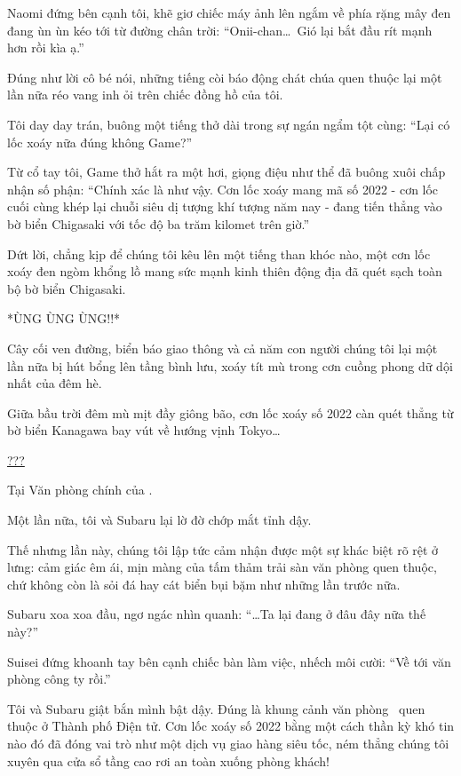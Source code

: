 \documentclass[../main.tex]{subfiles}
\begin{document}
Naomi đứng bên cạnh tôi, khẽ giơ chiếc máy ảnh lên ngắm về phía rặng mây đen đang ùn ùn kéo tới từ đường chân trời: ``Onii-chan\dots\ Gió lại bắt đầu rít mạnh hơn rồi kìa ạ.''

Đúng như lời cô bé nói, những tiếng còi báo động chát chúa quen thuộc lại một lần nữa réo vang inh ỏi trên chiếc đồng hồ của tôi.

Tôi day day trán, buông một tiếng thở dài trong sự ngán ngẩm tột cùng: ``Lại có lốc xoáy nữa đúng không Game?''

Từ cổ tay tôi, Game thở hắt ra một hơi, giọng điệu như thể đã buông xuôi chấp nhận số phận: ``Chính xác là như vậy. Cơn lốc xoáy mang mã số 2022 - cơn lốc cuối cùng khép lại chuỗi siêu dị tượng khí tượng năm nay - đang tiến thẳng vào bờ biển Chigasaki với tốc độ ba trăm kilomet trên giờ.''

Dứt lời, chẳng kịp để chúng tôi kêu lên một tiếng than khóc nào, một cơn lốc xoáy đen ngòm khổng lồ mang sức mạnh kinh thiên động địa đã quét sạch toàn bộ bờ biển Chigasaki.

*ÙNG ÙNG ÙNG!!*

Cây cối ven đường, biển báo giao thông và cả năm con người chúng tôi lại một lần nữa bị hút bổng lên tầng bình lưu, xoáy tít mù trong cơn cuồng phong dữ dội nhất của đêm hè.

Giữa bầu trời đêm mù mịt đầy giông bão, cơn lốc xoáy số 2022 càn quét thẳng từ bờ biển Kanagawa bay vút về hướng vịnh Tokyo\dots

\ct

\begin{center}
  \uline{???}
\end{center}

Tại Văn phòng chính của \hll.

Một lần nữa, tôi và Subaru lại lờ đờ chớp mắt tỉnh dậy.

Thế nhưng lần này, chúng tôi lập tức cảm nhận được một sự khác biệt rõ rệt ở lưng: cảm giác êm ái, mịn màng của tấm thảm trải sàn văn phòng quen thuộc, chứ không còn là sỏi đá hay cát biển bụi bặm như những lần trước nữa.

Subaru xoa xoa đầu, ngơ ngác nhìn quanh: ``\dots Ta lại đang ở đâu đây nữa thế này?''

Suisei đứng khoanh tay bên cạnh chiếc bàn làm việc, nhếch môi cười: ``Về tới văn phòng công ty rồi.''

Tôi và Subaru giật bắn mình bật dậy. Đúng là khung cảnh văn phòng \hll\ quen thuộc ở Thành phố Điện tử. Cơn lốc xoáy số 2022 bằng một cách thần kỳ khó tin nào đó đã đóng vai trò như một dịch vụ giao hàng siêu tốc, ném thẳng chúng tôi xuyên qua cửa sổ tầng cao rơi an toàn xuống phòng khách!
\end{document}
